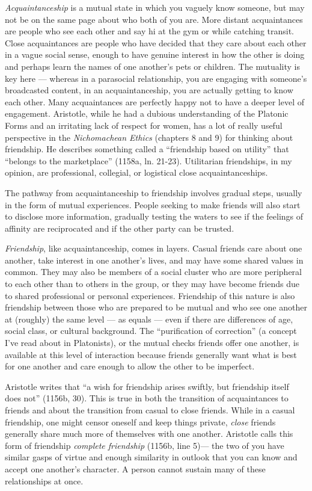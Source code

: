 \documentclass[
]{book}
\begin{document}
\emph{Acquaintanceship} is a mutual state in which you vaguely know someone, but may not be on the same page about who both of you are. More distant acquaintances are people who see each other and say hi at the gym or while catching transit. Close acquaintances are people who have decided that they care about each other in a vague social sense, enough to have genuine interest in how the other is doing and perhaps learn the names of one another's pets or children. The mutuality is key here --- whereas in a parasocial relationship, you are engaging with someone's broadcasted content, in an acquaintanceship, you are actually getting to know each other. Many acquaintances are perfectly happy not to have a deeper level of engagement. Aristotle, while he had a dubious understanding of the Platonic Forms and an irritating lack of respect for women, has a lot of really useful perspective in the \emph{Nichomachean Ethics} (chapters 8 and 9) for thinking about friendship. He describes something called a ``friendship based on utility'' that ``belongs to the marketplace'' (1158a, ln. 21-23). Utilitarian friendships, in my opinion, are professional, collegial, or logistical close acquaintanceships.

The pathway from acquaintanceship to friendship involves gradual steps, usually in the form of mutual experiences. People seeking to make friends will also start to disclose more information, gradually testing the waters to see if the feelings of affinity are reciprocated and if the other party can be trusted.

\emph{Friendship}, like acquaintanceship, comes in layers. Casual friends care about one another, take interest in one another's lives, and may have some shared values in common. They may also be members of a social cluster who are more peripheral to each other than to others in the group, or they may have become friends due to shared professional or personal experiences. Friendship of this nature is also friendship between those who are prepared to be mutual and who see one another at (roughly) the same level --- as equals --- even if there are differences of age, social class, or cultural background. The ``purification of correction'' (a concept I've read about in Platonists), or the mutual checks friends offer one another, is available at this level of interaction because friends generally want what is best for one another and care enough to allow the other to be imperfect.

Aristotle writes that ``a wish for friendship arises swiftly, but friendship itself does not'' (1156b, 30). This is true in both the transition of acquaintances to friends and about the transition from casual to close friends. While in a casual friendship, one might censor oneself and keep things private, \emph{close} friends generally share much more of themselves with one another. Aristotle calls this form of friendship \emph{complete friendship} (1156b, line 5)--- the two of you have similar gasps of virtue and enough similarity in outlook that you can know and accept one another's character. A person cannot sustain many of these relationships at once.
\end{document}
